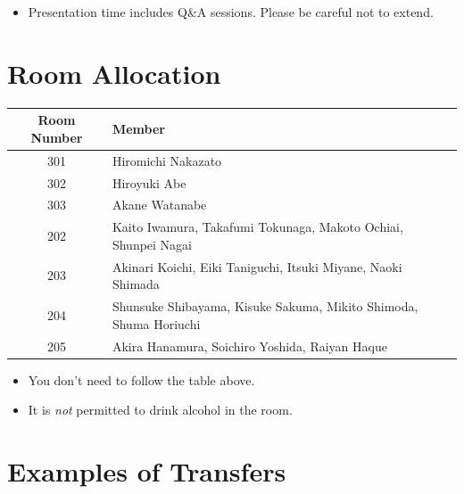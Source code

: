 \documentclass[unicode,a4paper,11pt]{ltjsarticle}
\begin{document}
\begin{itemize}
  \item
        Presentation time includes Q\&A sessions. Please be careful not to extend.
\end{itemize}

\section{Room Allocation}

\begin{center}
  \begin{tabular}{cl}\hline
    Room Number & Member                                                            \\ \hline
    301         & Hiromichi Nakazato                                                \\
    302         & Hiroyuki Abe                                                      \\
    303         & Akane Watanabe                                                    \\
    202         & Kaito Iwamura, Takafumi Tokunaga, Makoto Ochiai, Shunpei Nagai    \\
    203         & Akinari Koichi, Eiki Taniguchi, Itsuki Miyane, Naoki Shimada      \\
    204         & Shunsuke Shibayama, Kisuke Sakuma, Mikito Shimoda, Shuma Horiuchi \\
    205         & Akira Hanamura, Soichiro Yoshida, Raiyan Haque                    \\ \hline
  \end{tabular}
\end{center}

\begin{itemize}
  \item
        You don't need to follow the table above.
  \item
        It is \textit{not} permitted to drink alcohol in the room.
\end{itemize}


\section{Examples of Transfers}

\vspace*{5pt}
\end{document}
